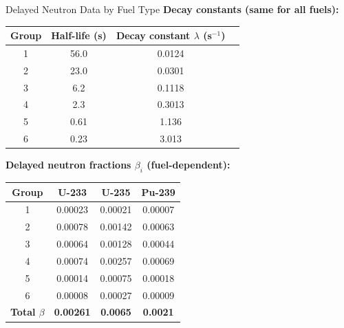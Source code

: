 \documentclass[aspectratio=169]{beamer}
\begin{document}
\begin{frame}[allowframebreaks]{Delayed Neutron Data by Fuel Type}
    \small
    \textbf{Decay constants (same for all fuels):}
    
    \begin{tabular}{cccc}
        \toprule
        \textbf{Group} & \textbf{Half-life (s)} & \textbf{Decay constant $\lambda$ (s$^{-1}$)} \\
        \midrule
        1 & 56.0 & 0.0124 \\
        2 & 23.0 & 0.0301 \\
        3 & 6.2 & 0.1118 \\
        4 & 2.3 & 0.3013 \\
        5 & 0.61 & 1.136 \\
        6 & 0.23 & 3.013 \\
        \bottomrule
    \end{tabular}

    \vspace{1em}
    \textbf{Delayed neutron fractions $\beta_i$ (fuel-dependent):}
    
    \begin{tabular}{cccc}
        \toprule
        \textbf{Group} & \textbf{U-233} & \textbf{U-235} & \textbf{Pu-239} \\
        \midrule
        1 & 0.00023 & 0.00021 & 0.00007 \\
        2 & 0.00078 & 0.00142 & 0.00063 \\
        3 & 0.00064 & 0.00128 & 0.00044 \\
        4 & 0.00074 & 0.00257 & 0.00069 \\
        5 & 0.00014 & 0.00075 & 0.00018 \\
        6 & 0.00008 & 0.00027 & 0.00009 \\
        \midrule
        \textbf{Total $\beta$} & \textbf{0.00261} & \textbf{0.0065} & \textbf{0.0021} \\
        \bottomrule
    \end{tabular}
\end{frame}
\end{document}

